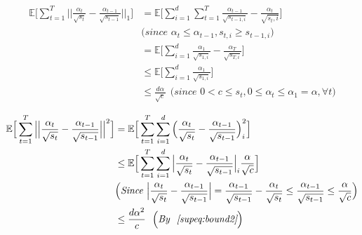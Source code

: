 \documentclass{article}
\begin{document}
\begin{align}
\label{supeq:bound2}
\mathbb{E} \Big[ \sum_{t=1}^T \Big \vert \Big \vert \frac{\alpha_t}{\sqrt{s_t}} - \frac{\alpha_{t-1}}{\sqrt{s_{t-1}}} \Big \vert \Big \vert_1 \Big] &= \mathbb{E} \Big[ \sum_{i=1}^d \sum_{t=1}^T  \frac{\alpha_{t-1}}{\sqrt{s_{t-1,i}}} - \frac{\alpha_t}{\sqrt{s_t,i}} \Big] \nonumber \\ 
&\Big( \textit{since\ } \alpha_t \leq \alpha_{t-1}, s_{t,i} \geq s_{t-1, i} \Big) \nonumber \\
&= \mathbb{E} \Big[ \sum_{i=1}^d \frac{\alpha_1}{\sqrt{s_{1,i}}} - \frac{\alpha_T}{\sqrt{s_{T,i}}} \Big] \nonumber \\
&\leq \mathbb{E} \Big[ \sum_{i=1}^d \frac{\alpha_1}{\sqrt{s_{1,i}}} \Big] \nonumber \\
& \leq \frac{d \alpha}{\sqrt{c}}\ \ \Big( \textit{since\ } 0<c\leq s_t, 0 \leq \alpha_t \leq \alpha_1 = \alpha, \forall t \Big)
\end{align} 

\begin{align}
\label{supeq:bound3}
\mathbb{E} \Big[ \sum_{t=1}^T  \Big \vert \Big \vert \frac{\alpha_t}{\sqrt{s_t}} - \frac{\alpha_{t-1}}{\sqrt{s_{t-1}}}\Big \vert \Big \vert^2 \Big] &= \mathbb{E} \Big[ \sum_{t=1}^T \sum_{i=1}^d   \Big( \frac{\alpha_t}{\sqrt{s_t}} - \frac{\alpha_{t-1}}{\sqrt{s_{t-1}}} \Big)_i^2 \Big] \nonumber \\
&\leq \mathbb{E} \Big[\sum_{t=1}^T \sum_{i=1}^d   \Big \vert \frac{\alpha_t}{\sqrt{s_t}} - \frac{\alpha_{t-1}}{\sqrt{s_{t-1}}} \Big \vert_i \frac{\alpha}{\sqrt{c}} \Big] \nonumber \\ 
& \Big( \textit{Since\ } \Big \vert \frac{\alpha_t}{\sqrt{s_t}} - \frac{\alpha_{t-1}}{\sqrt{s_{t-1}}} \Big \vert =  \frac{\alpha_{t-1}}{\sqrt{s_{t-1}}} - \frac{\alpha_t}{\sqrt{s_t}} \leq \frac{\alpha_{t-1}}{\sqrt{s_{t-1}}} \leq \frac{\alpha}{\sqrt{c}}\Big) \nonumber \\
&\leq \frac{d \alpha^2}{c} \ \ \Big( \textit{By ~\eqref{supeq:bound2}}  \Big)
\end{align}
\end{document}
